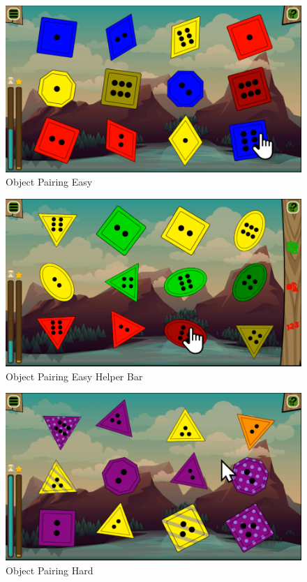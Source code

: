 \begin{figure}[H]
    \centering
    \includegraphics[width=1\textwidth]{figures/gameasy}
    \caption{Object Pairing Easy}
    \label{fig:gameeasy}
\end{figure}

\begin{figure}[H]
    \centering
    \includegraphics[width=1\textwidth]{figures/gameeasyhelp}
    \caption{Object Pairing Easy Helper Bar}
    \label{fig:gameeasyhelp}
\end{figure}

\begin{figure}[H]
    \centering
    \includegraphics[width=1\textwidth]{figures/gamehard}
    \caption{Object Pairing Hard}
    \label{fig:gamehard}
\end{figure}

